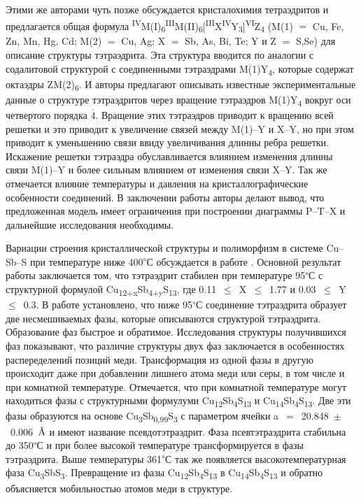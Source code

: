 Этими же авторами \cite{Johnson1988} чуть позже обсуждается кристалохимия тетраэдритов и предлагается общая формула \textsuperscript{IV}M(I)\textsubscript{6}\textsuperscript{III}M(II)\textsubscript{6}[\textsuperscript{III}X\textsuperscript{IV}Y\textsubscript{3}]\textsuperscript{VI}Z\textsubscript{4} (M(1) $=$ Cu, Fe, Zn, Mn, Hg, Cd; M(2) $=$ Cu, Ag; X $=$ Sb, As, Bi, Te; Y и Z $=$ S,Se)  для описание структуры тэтраэдрита. Эта структура вводится по аналогии с содалитовой структурой с соединенными тэтраэдрами M(1)Y\textsubscript{4}, которые содержат октаэдры ZM(2)\textsubscript{6}. И авторы предлагают описывать известные экспериментальные данные о структуре тэтраэдритов через вращение тэтраэдров M(1)Y\textsubscript{4} вокруг оси четвертого порядка $\overline{\!4}$. Вращение этих тэтраэдров приводит к вращению всей решетки и это приводит к увеличение связей между M(1)--Y и X--Y, но при этом приводит к уменьшению связи ввиду увеличивания длинны ребра решетки. Искажение решетки тэтраэдра обуславливается влиянием изменения длинны связи M(1)--Y и более сильным влиянием от изменения связи X--Y. Так же отмечается влияние температуры и давления на кристаллографические особенности соединений. В заключении работы авторы делают вывод, что предложенная модель имеет ограничения при построении диаграммы P--T--X и дальнейшие исследования необходимы.

Вариации строения кристаллической структуры и полиморфизм в системе Cu--Sb--S при температуре ниже 400\textsuperscript{$\circ$}С обсуждается в работе \cite{Tatsuka_1977}. Основной результат работы заключается том, что тэтраэдрит стабилен при температуре 95\textsuperscript{$\circ$}С с структурной формулой Cu\textsubscript{12+x}Sb\textsubscript{4+y}S\textsubscript{13}, где 0.11~$\leqslant$~X~$\leqslant$~1.77 и 0.03~$\leqslant$~Y~$\leqslant$~0.3. В работе установлено, что ниже 95\textsuperscript{$\circ$}С соединение тэтраэдрита образует две несмешиваемых фазы, которые описываются структурой тэтраэдрита. Образование фаз быстрое и обратимое. Исследования структуры получившихся фаз показывают, что различие структуры двух фаз заключается в особенностях распеределений позиций меди. Трансформация из одной фазы в другую происходит даже при добавлении лишнего атома меди или серы, в том числе и при комнатной температуре. Отмечается, что при комнатной температуре могут находиться фазы с структурными формулуми Cu\textsubscript{12}Sb\textsubscript{4}S\textsubscript{13} и Cu\textsubscript{14}Sb\textsubscript{4}S\textsubscript{13}. Две эти фазы образуются на основе Cu\textsubscript{3}Sb\textsubscript{0,99}S\textsubscript{3} с параметром ячейки a~$=$~20.848~$\pm$~0.006~$\mbox{\normalfont\AA}$ и имеют название псевдотэтраэдрит. Фаза псевтэтраэдрита стабильна до 350\textsuperscript{$\circ$}С и при более высокой температуре трансформируется в фазы тэтраэдрита. Выше температуры 361\textsuperscript{$\circ$}С так же появляется высокотемпературная фаза Cu\textsubscript{3}SbS\textsubscript{3}. Превращение из фазы Cu\textsubscript{12}Sb\textsubscript{4}S\textsubscript{13} в Cu\textsubscript{14}Sb\textsubscript{4}S\textsubscript{13} и обратно объясняется мобильностью атомов меди в структуре.

